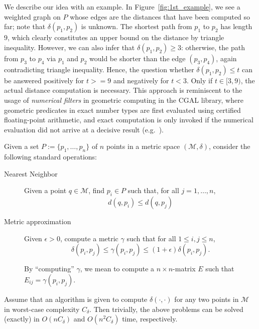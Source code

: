 \documentclass[a4paper,USenglish]{socg-lipics-v2018}
\newcommand{\eps}{\epsilon}
\newcommand{\pointset}{P}
\newcommand{\distspace}{\mathcal{M}}
\newcommand{\dist}{\delta}
\newcommand{\adist}{\gamma}
\newcommand{\complexity}{C_{\dist}}
\begin{document}
We describe our idea with an example. In Figure~\ref{fig:1st_example},
we see a weighted graph on $P$ whose edges are the distances that have
been computed so far; note that $\dist(p_1,p_2)$ is unknown. 
The shortest path from $p_1$ to $p_2$ has length $9$, which clearly
constitutes an upper bound on the distance by triangle inequality.
However, we can also infer that $\dist(p_1,p_2)\geq 3$:
otherwise, the path from $p_3$ to $p_4$ via $p_1$ and $p_2$
would be shorter than the edge $(p_3,p_4)$, again contradicting
triangle inequality.
Hence, the question whether $\dist(p_1,p_2)\leq t$ can be answered positively
for $t>=9$ and negatively for $t<3$. Only if $t\in[3,9)$, the actual
distance computation is necessary. This approach is reminiscent to the usage
of \emph{numerical filters} in geometric computing in the CGAL library,
where geometric predicates in exact number types are first evaluated using 
certified floating-point arithmetic, and exact computation is only
invoked if the numerical evaluation did not arrive at a decisive result
(e.g.~\cite{bbp-interval,kerber-phd}).



Given a set $\pointset:=\{p_1,\ldots,p_n\}$ of $n$ points
in a metric space $(\distspace,\dist)$, 
consider the following standard operations:

\begin{description}
\item[Nearest Neighbor] Given a point $q\in\distspace$,
find $p_i\in\pointset$ such that, for all $j=1,\ldots,n$,
\[d(q,p_i)\leq d(q,p_j)\]

\item[Metric approximation] Given $\eps>0$, compute a metric $\adist$
such that for all $1\leq i,j\leq n$,
%
\[\dist(p_i,p_j)\leq \adist(p_i,p_j) \leq (1+\eps) \dist(p_i,p_j).\]

By ``computing'' $\adist$, we mean to compute a $n\times n$-matrix $E$ 
such that $E_{ij}=\adist(p_i,p_j)$.
\end{description}

Assume that an algorithm is given to compute $\dist(\cdot,\cdot)$
for any two points in $\distspace$ in worst-case complexity $\complexity$.
Then trivially, the above problems can be solved (exactly) in
$O(n\complexity)$ and $O(n^2\complexity)$ time, respectively.
\end{document}
